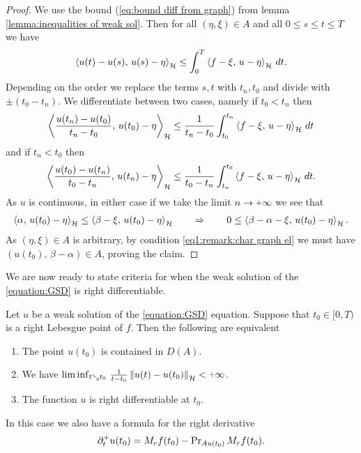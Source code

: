 \begin{proof}
	We use the bound (\ref{eq:bound diff from graph}) from lemma
	\ref{lemma:inequalities of weak sol}. Then for all $(\eta, \xi)\in A$
	and all $0\leq s\leq t\leq T$ we have
	\begin{align*}
		\left\langle u(t)-u(s),\,u(s)-\eta\right\rangle_{\mathcal{H}}
		\leq \int_0^T \left\langle f-\xi,\,u-\eta\right\rangle_{\mathcal{H}}\,dt.
	\end{align*}
	Depending on the order we replace the terms $ s,t $ with 
	$ t_n,t_0 $ and divide with $ \pm(t_0-t_n) $.
	We differentiate between two cases, namely if $t_0< t_n$ then
	\begin{align*}
		\left\langle \frac{u(t_n)-u(t_0)}{t_n-t_0},\,u(t_0)-\eta\right\rangle_{\mathcal{H}}
		\leq \frac{1}{t_n-t_0}\int_{t_0}^{t_n} \left\langle f-\xi,\,u-\eta\right\rangle_{\mathcal{H}}\,dt
	\end{align*}
	and if $t_n< t_0$ then
	\begin{align*}
		\left\langle \frac{u(t_0)-u(t_n)}{t_0-t_n},\,u(t_n)-\eta\right\rangle_{\mathcal{H}}
		\leq \frac{1}{t_0-t_n}\int_{t_n}^{t_0} \left\langle f-\xi,\,u-\eta\right\rangle_{\mathcal{H}}\,dt.
	\end{align*}
	As $ u $ is continuous, in either case if we take the limit 
	$n\ra \plus\infty$ we see that
	\begin{align*}
		\left\langle \alpha,\,u(t_0)-\eta\right\rangle_{\mathcal{H}}\leq \left\langle \beta-\xi,\,u(t_0)-\eta\right\rangle_{\mathcal{H}}
		\qquad\Rightarrow\qquad
		0\leq \left\langle \beta-\alpha-\xi,\,u(t_0)-\eta\right\rangle_{\mathcal{H}}.
	\end{align*}
	As $(\eta,\xi)\in A$ is arbitrary, by condition 
	\eqref{eq1:remark:char graph el} 
	we must have $ (u(t_0),\, \beta-\alpha)\in A $, proving the claim.
\end{proof}

We are now ready to state criteria for when the weak solution
of the \ref{equation:GSD} is right differentiable.

\begin{theorem}\label{theorem:cond weak sol to inhom gf is r diff}
	Let $ u $ be a weak solution of the \ref{equation:GSD}
	equation. Suppose that $ t_0\in[0,T) $ is a right Lebesgue point of
	$f$. Then the following are equivalent
	\begin{enumerate}[label=(\roman*)]
		\item The point $ u(t_0) $ is contained in $ D(A) $.
		\item We have 
		$ \liminf_{t \se t_0}\,\frac{1}{t-t_0}\norm{u(t)-u(t_0)} < \plus\infty$.
		\item The function $ u $ is right differentiable at $ t_0 $.
	\end{enumerate}
	In this case we also have a formula for the right derivative
	\begin{align*}
		\partial_t^+ u(t_0)
		=M_rf(t_0)-\operatorname{\mathrm{Pr}}_{Au(t_0)} M_rf(t_0).
	\end{align*}
\end{theorem}

